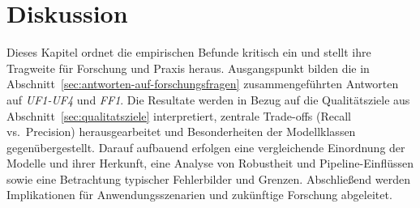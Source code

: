 \chapter{Diskussion}\label{ch:diskussion}

Dieses Kapitel ordnet die empirischen Befunde kritisch ein und stellt ihre Tragweite für Forschung und Praxis heraus. Ausgangspunkt bilden die in Abschnitt~\ref{sec:antworten-auf-forschungsfragen} zusammengeführten Antworten auf \emph{UF1-UF4} und \emph{FF1}. Die Resultate werden in Bezug auf die Qualitätsziele aus Abschnitt~\ref{sec:qualitatsziele} interpretiert, zentrale Trade-offs (Recall vs.\ Precision) herausgearbeitet und Besonderheiten der Modellklassen gegenübergestellt. Darauf aufbauend erfolgen eine vergleichende Einordnung der Modelle und ihrer Herkunft, eine Analyse von Robustheit und Pipeline-Einflüssen sowie eine Betrachtung typischer Fehlerbilder und Grenzen. Abschließend werden Implikationen für Anwendungsszenarien und zukünftige Forschung abgeleitet.









